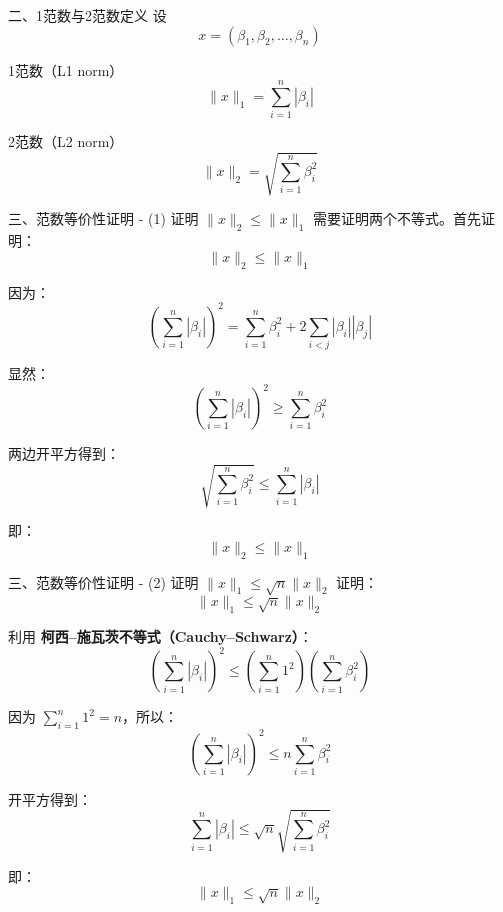 \documentclass[aspectratio=169]{beamer}
\begin{document}
\begin{frame}{二、1范数与2范数定义}
    设
    $$ x=(\beta_1,\beta_2,\dots,\beta_n) $$
    
    \begin{block}{1范数（L1 norm）}
        $$ \|x\|_1=\sum_{i=1}^{n}|\beta_i| $$
    \end{block}

    \begin{block}{2范数（L2 norm）}
        $$ \|x\|_2=\sqrt{\sum_{i=1}^{n}\beta_i^2} $$
    \end{block}
\end{frame}

\begin{frame}{三、范数等价性证明 - (1) 证明 $\|x\|_2 \le \|x\|_1$}
    需要证明两个不等式。首先证明：$$ \|x\|_2 \le \|x\|_1 $$
    
    因为：
    $$ \left(\sum_{i=1}^{n}|\beta_i|\right)^2 = \sum_{i=1}^{n}\beta_i^2 +2\sum_{i<j}|\beta_i||\beta_j| $$
    
    显然：
    $$ \left(\sum_{i=1}^{n}|\beta_i|\right)^2 \ge \sum_{i=1}^{n}\beta_i^2 $$
    
    两边开平方得到：
    $$ \sqrt{\sum_{i=1}^{n}\beta_i^2} \le \sum_{i=1}^{n}|\beta_i| $$
    
    即：
    $$ \|x\|_2 \le \|x\|_1 $$
\end{frame}

\begin{frame}{三、范数等价性证明 - (2) 证明 $\|x\|_1 \le \sqrt{n}\|x\|_2$}
    证明：$$ \|x\|_1 \le \sqrt{n}\|x\|_2 $$
    
    利用 \textbf{柯西–施瓦茨不等式（Cauchy–Schwarz）}：
    $$ \left(\sum_{i=1}^{n}|\beta_i|\right)^2 \le \left(\sum_{i=1}^{n}1^2\right) \left(\sum_{i=1}^{n}\beta_i^2\right) $$
    
    因为 $\sum_{i=1}^{n}1^2=n$，所以：
    $$ \left(\sum_{i=1}^{n}|\beta_i|\right)^2 \le n\sum_{i=1}^{n}\beta_i^2 $$
    
    开平方得到：
    $$ \sum_{i=1}^{n}|\beta_i| \le \sqrt{n}\sqrt{\sum_{i=1}^{n}\beta_i^2} $$
    
    即：
    $$ \|x\|_1 \le \sqrt{n}\|x\|_2 $$
\end{frame}
\end{document}
